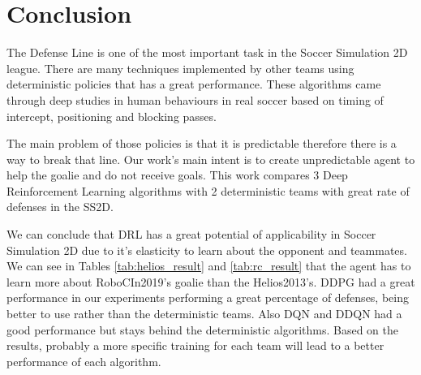 \chapter{Conclusion}\label{chapter:conclusion}

The Defense Line is one of the most important task in the Soccer Simulation 2D league. There are many techniques implemented by other teams using deterministic policies that has a great performance. These algorithms came through deep studies in human behaviours in real soccer based on timing of intercept, positioning and blocking passes.

The main problem of those policies is that it is predictable therefore there is a way to break that line. Our work's main intent is to create unpredictable agent to help the goalie and do not receive goals. This work compares 3 Deep Reinforcement Learning algorithms with 2 deterministic teams with great rate of defenses in the SS2D.

We can conclude that DRL has a great potential of applicability in Soccer Simulation 2D due to it's elasticity to learn about the opponent and teammates. We can see in Tables \ref{tab:helios_result} and \ref{tab:rc_result} that the agent has to learn more about RoboCIn2019's goalie than the Helios2013's. DDPG had a great performance in our experiments performing a great percentage of defenses, being better to use rather than the deterministic teams. Also DQN and DDQN had a good performance but stays behind the deterministic algorithms. Based on the results, probably a more specific training for each team will lead to a better performance of each algorithm.